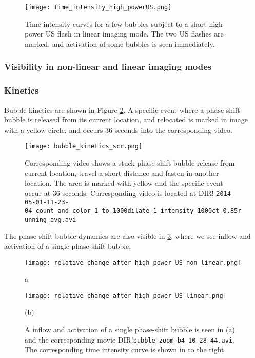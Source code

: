 \begin{figure}[h]
  \centering
  \texttt{[image: time\_intensity\_high\_powerUS.png]}
  \caption{Time intensity curves for a few bubbles subject to a short high power US flash in linear imaging mode. The two US flashes are marked, and activation of some bubbles is seen immediately.}
  \label{Fig:high_power_US}
\end{figure}
 

\subsubsection{Visibility in non-linear and linear imaging modes} 

\subsubsection{Kinetics}
Bubble kinetics are shown in Figure \ref{Fig:bubble_kinetic}. A specific event where a phase-shift bubble is released from its current location, and relocated is marked in image with a yellow circle, and occurs 36 seconds into the corresponding video.

\begin{figure}[h]
  \centering
  \texttt{[image: bubble\_kinetics\_scr.png]}
  \cprotect\caption{Corresponding video shows a stuck phase-shift bubble release from current location, travel a short distance and fasten in another location. The area is marked with yellow and the specific event occur at 36 seconds. Corresponding video is located at DIR! \verb|2014-05-01-11-23-04_count_and_color_1_to_1000dilate_1_intensity_1000ct_0.85running_avg.avi|}
  \label{Fig:bubble_kinetic}
\end{figure}

The phase-shift bubble dynamics are also visible in \ref{bubble_zoom}, where we see inflow and activation of a single phase-shift bubble.

\begin{figure}
	\centering
	\begin{minipage}[t]{.45\textwidth}
		\centering
		\texttt{[image: relative change after high power US non linear.png]}
		\caption{a}
	\end{minipage}\hfill
	\begin{minipage}[t]{.45\textwidth}
		\centering
		\texttt{[image: relative change after high power US linear.png]}
		\caption{(b)}
	\end{minipage}
	 \cprotect\caption{A inflow and activation of a single phase-shift bubble is seen in (a) and the corresponding movie DIR!\verb|bubble_zoom_b4_10_28_44.avi|. The corresponding time intensity curve is shown in to the right.}
	\label{bubble_zoom}
\end{figure}

